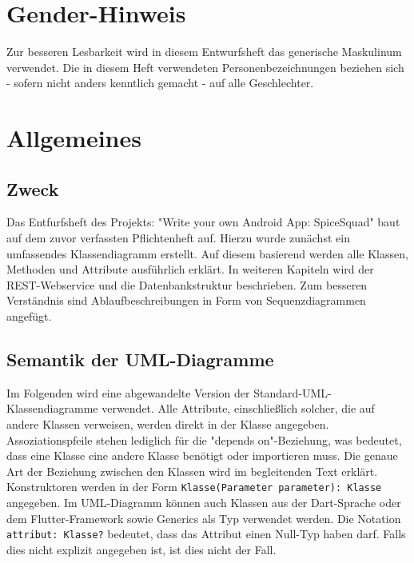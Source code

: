 \documentclass{entwurfsheft}
\begin{document}

\maketitle
\tableofcontents
\newpage

\section*{Gender-Hinweis}
Zur besseren Lesbarkeit wird in diesem Entwurfsheft das generische Maskulinum verwendet.
Die in diesem Heft verwendeten Personenbezeichnungen beziehen sich - sofern nicht anders kenntlich gemacht - auf alle Geschlechter.
\newpage

\section{Allgemeines}
\subsection{Zweck}
Das Entfurfsheft des Projekts: "Write your own Android App: SpiceSquad" baut auf dem zuvor verfassten Pflichtenheft auf.
Hierzu wurde zunächst ein umfassendes Klassendiagramm erstellt. Auf diesem basierend werden alle Klassen, Methoden und Attribute ausführlich erklärt.
In weiteren Kapiteln wird der REST-Webservice und die Datenbankstruktur beschrieben. Zum besseren Verständnis sind Ablaufbeschreibungen in Form von Sequenzdiagrammen angefügt.

\subsection{Semantik der UML-Diagramme}
Im Folgenden wird eine abgewandelte Version der Standard-UML-Klassendiagramme verwendet. Alle Attribute, einschließlich solcher, die auf andere Klassen verweisen, werden direkt in der Klasse angegeben. Assoziationspfeile stehen lediglich für die "depends on"-Beziehung, was bedeutet, dass eine Klasse eine andere Klasse benötigt oder importieren muss. Die genaue Art der Beziehung zwischen den Klassen wird im begleitenden Text erklärt. Konstruktoren werden in der Form \texttt{Klasse(Parameter parameter): Klasse} angegeben. Im UML-Diagramm können auch Klassen aus der Dart-Sprache oder dem Flutter-Framework sowie Generics als Typ verwendet werden. Die Notation \texttt{attribut: Klasse?} bedeutet, dass das Attribut einen Null-Typ haben darf. Falls dies nicht explizit angegeben ist, ist dies nicht der Fall.
\end{document}
